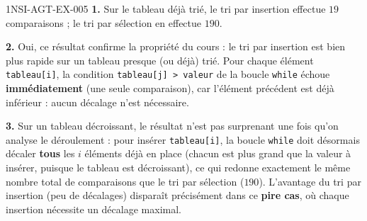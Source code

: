 \begin{corrige}{1NSI-AGT-EX-005}
\textbf{1.} Sur le tableau déjà trié, le tri par insertion effectue $19$ comparaisons ; le
tri par sélection en effectue $190$.

\textbf{2.} Oui, ce résultat confirme la propriété du cours : le tri par insertion est
bien plus rapide sur un tableau presque (ou déjà) trié. Pour chaque élément
\lstinline{tableau[i]}, la condition \lstinline{tableau[j] > valeur} de la boucle
\lstinline{while} échoue \textbf{immédiatement} (une seule comparaison), car l'élément
précédent est déjà inférieur : aucun décalage n'est nécessaire.

\textbf{3.} Sur un tableau décroissant, le résultat n'est pas surprenant une fois qu'on
analyse le déroulement : pour insérer \lstinline{tableau[i]}, la boucle \lstinline{while}
doit désormais décaler \textbf{tous} les $i$ éléments déjà en place (chacun est plus grand
que la valeur à insérer, puisque le tableau est décroissant), ce qui redonne exactement le
même nombre total de comparaisons que le tri par sélection ($190$). L'avantage du tri par
insertion (peu de décalages) disparaît précisément dans ce \textbf{pire cas}, où chaque
insertion nécessite un décalage maximal.
\end{corrige}
